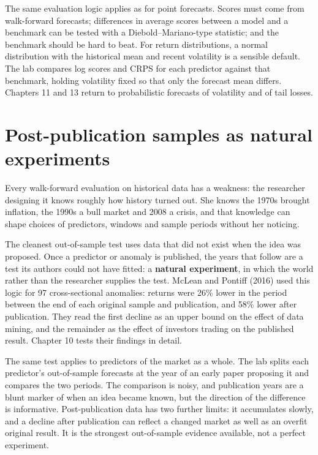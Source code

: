 The same evaluation logic applies as for point forecasts. Scores must come from walk-forward forecasts; differences in average scores between a model and a benchmark can be tested with a Diebold--Mariano-type statistic; and the benchmark should be hard to beat. For return distributions, a normal distribution with the historical mean and recent volatility is a sensible default. The lab compares log scores and CRPS for each predictor against that benchmark, holding volatility fixed so that only the forecast mean differs. Chapters 11 and 13 return to probabilistic forecasts of volatility and of tail losses.

\section{Post-publication samples as natural experiments}
\label{sec:05-postpub}

Every walk-forward evaluation on historical data has a weakness: the researcher designing it knows roughly how history turned out. She knows the 1970s brought inflation, the 1990s a bull market and 2008 a crisis, and that knowledge can shape choices of predictors, windows and sample periods without her noticing.

The cleanest out-of-sample test uses data that did not exist when the idea was proposed. Once a predictor or anomaly is published, the years that follow are a test its authors could not have fitted: a \textbf{natural experiment}, in which the world rather than the researcher supplies the test. McLean and Pontiff (2016) used this logic for 97 cross-sectional anomalies: returns were 26\% lower in the period between the end of each original sample and publication, and 58\% lower after publication. They read the first decline as an upper bound on the effect of data mining, and the remainder as the effect of investors trading on the published result. Chapter 10 tests their findings in detail.

The same test applies to predictors of the market as a whole. The lab splits each predictor's out-of-sample forecasts at the year of an early paper proposing it and compares the two periods. The comparison is noisy, and publication years are a blunt marker of when an idea became known, but the direction of the difference is informative. Post-publication data has two further limits: it accumulates slowly, and a decline after publication can reflect a changed market as well as an overfit original result. It is the strongest out-of-sample evidence available, not a perfect experiment.

